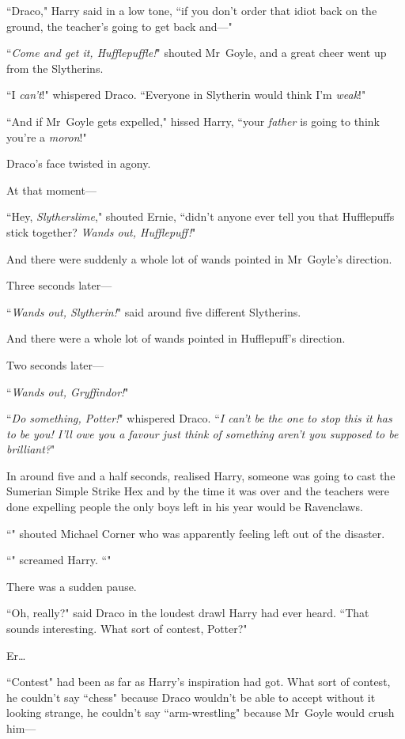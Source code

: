 ``Draco," Harry said in a low tone, ``if you don't order that idiot back on the ground, the teacher's going to get back and—"

``\emph{Come and get it, Hufflepuffle!}" shouted Mr~Goyle, and a great cheer went up from the Slytherins.

``I \emph{can't}!" whispered Draco. ``Everyone in Slytherin would think I'm \emph{weak}!"

``And if Mr~Goyle gets expelled," hissed Harry, ``your \emph{father} is going to think you're a \emph{moron}!"

Draco's face twisted in agony.

At that moment—

``Hey, \emph{Slytherslime}," shouted Ernie, ``didn't anyone ever tell you that Hufflepuffs stick together? \emph{Wands out, Hufflepuff!}"

And there were suddenly a whole lot of wands pointed in Mr~Goyle's direction.

Three seconds later—

``\emph{Wands out, Slytherin!}" said around five different Slytherins.

And there were a whole lot of wands pointed in Hufflepuff's direction.

Two seconds later—

``\emph{Wands out, Gryffindor!}"

``\emph{Do something, Potter!}" whispered Draco. ``\emph{I can't be the one to stop this it has to be you! I'll owe you a favour just think of something aren't you supposed to be brilliant?}"

In around five and a half seconds, realised Harry, someone was going to cast the Sumerian Simple Strike Hex and by the time it was over and the teachers were done expelling people the only boys left in his year would be Ravenclaws.

``" shouted Michael Corner who was apparently feeling left out of the disaster.

``" screamed Harry. ``"

There was a sudden pause.

``Oh, really?" said Draco in the loudest drawl Harry had ever heard. ``That sounds interesting. What sort of contest, Potter?"

Er…

``Contest" had been as far as Harry's inspiration had got. What sort of contest, he couldn't say ``chess" because Draco wouldn't be able to accept without it looking strange, he couldn't say ``arm-wrestling" because Mr~Goyle would crush him—

